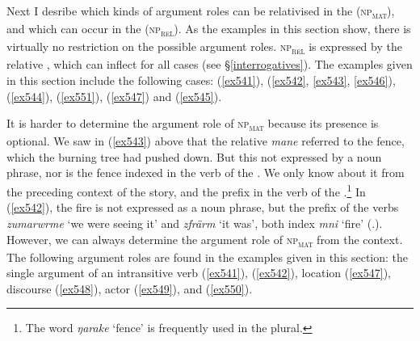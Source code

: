Next I desribe which kinds of argument roles can be relativised in the  (\textsc{np}\textsubscript{\textsc{mat}}), and which can occur in the  (\textsc{np}\textsubscript{\textsc{rel}}). As the examples in this section show, there is virtually no restriction on the possible argument roles. \textsc{np}\textsubscript{\textsc{rel}} is expressed by the relative , which can inflect for all cases (see \S{}\ref{interrogatives}). The examples given in this section include the following cases:  (\ref{ex541}),  (\ref{ex542}, \ref{ex543}, \ref{ex546}),  (\ref{ex544}),  (\ref{ex551}),  (\ref{ex547}) and  (\ref{ex545}).%

It is harder to determine the argument role of \textsc{np}\textsubscript{\textsc{mat}} because its presence is optional. We saw in (\ref{ex543}) above that the relative  \emph{mane} referred to the fence, which the burning tree had pushed down. But this not expressed by a noun phrase, nor is the fence indexed in the verb of the . We only know about it from the preceding context of the story, and the  prefix in the verb of the .\footnote{The word \emph{ŋarake} `fence' is frequently used in the plural.} In (\ref{ex542}), the fire is not expressed as a noun phrase, but the prefix of the verbs \emph{zumarwrme} `we were seeing it' and \emph{zfrärm} `it was', both index \emph{mni} `fire' (\Tsg.\F). However, we can always determine the argument role of \textsc{np}\textsubscript{\textsc{mat}} from the context. The following argument roles are found in the examples given in this section: the single argument of an intransitive verb (\ref{ex541}),  (\ref{ex542}), location (\ref{ex547}), discourse  (\ref{ex548}), actor (\ref{ex549}), and  (\ref{ex550}).

